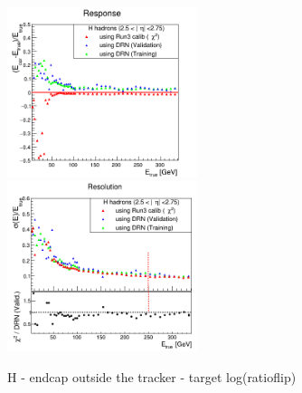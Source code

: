 \begin{figure}
\includegraphics[width=0.495\textwidth]{./plots_pdf/HCAL_plots/Trained_target_ratioflip_0_500_10/pdf/H_ec_out/EC_outside_tracker_corrEtaEndcapHcal.png}
\includegraphics[width=0.495\textwidth]{./plots_pdf/HCAL_plots/Trained_target_ratioflip_0_500_10/pdf/H_ec_out/EC_outside_tracker_corrEtaEndcapHcal_reso.png}
\caption{H - endcap outside the tracker - target log(ratioflip)}
\end{figure}
